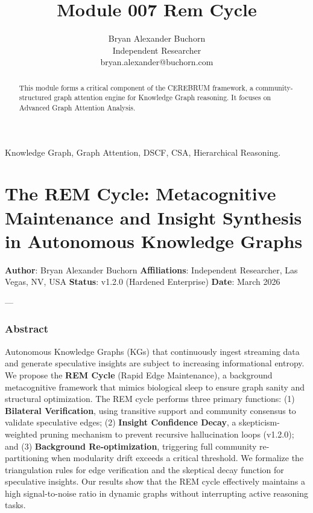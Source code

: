 \documentclass[10pt,journal,compsoc]{IEEEtran}
\begin{document}
\title{Module 007 Rem Cycle}
\author{Bryan Alexander Buchorn \\ Independent Researcher \\ bryan.alexander@buchorn.com}

\maketitle

\begin{abstract}
This module forms a critical component of the CEREBRUM framework, a community-structured graph attention engine for Knowledge Graph reasoning. It focuses on Advanced Graph Attention Analysis.
\end{abstract}

\begin{IEEEkeywords}
Knowledge Graph, Graph Attention, DSCF, CSA, Hierarchical Reasoning.
\end{IEEEkeywords}

\section{The REM Cycle: Metaco\-gnitive Maintenance and Insight Synthesis in Autonomous Knowledge Graphs}

\textbf{Author}: Bryan Alexander Buchorn  
\textbf{Affili\-ations}: Independent Researcher, Las Vegas, NV, USA  
\textbf{Status}: v1.2.0 (Hardened Enterprise)  
\textbf{Date}: March 2026

---

\subsubsection{Abstract}
Autonomous Knowledge Graphs (KGs) that conti\-nuously ingest streaming data and generate speculative insights are subject to increasing infor\-mational entropy. We propose the \textbf{REM Cycle} (Rapid Edge Maintenance), a background metac\-ognitive framework that mimics biological sleep to ensure graph sanity and structural optim\-ization. The REM cycle performs three primary functions: (1) \textbf{Bilateral Verifi\-cation}, using transitive support and community consensus to validate speculative edges; (2) \textbf{Insight Confidence Decay}, a skepticism-weighted pruning mechanism to prevent recursive hallu\-cination loops (v1.2.0); and (3) \textbf{Background Re-optim\-ization}, triggering full community re-parti\-tioning when modularity drift exceeds a critical threshold. We formalize the trian\-gulation rules for edge verif\-ication and the skeptical decay function for speculative insights. Our results show that the REM cycle effectively maintains a high signal-to-noise ratio in dynamic graphs without inter\-rupting active reasoning tasks.
\end{document}
